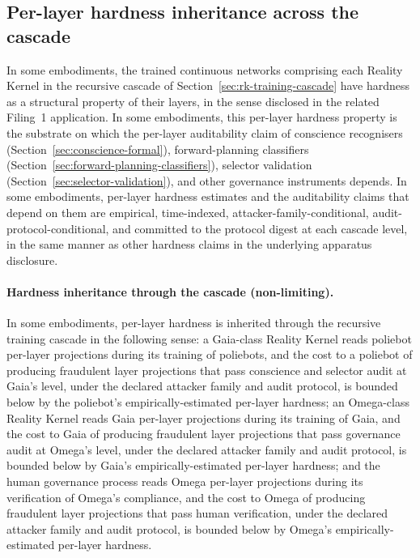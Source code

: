 \documentclass[a4paper,12pt]{article}
\newcommand{\RK}{Reality Kernel\xspace}
\begin{document}
\subsection{Per-layer hardness inheritance across the cascade}
\label{sec:per-layer-hardness}

In some embodiments, the trained continuous networks comprising each
\RK in the recursive cascade of
Section~\ref{sec:rk-training-cascade} have hardness as a structural
property of their layers, in the sense disclosed in the related
Filing~1 application. In some embodiments, this per-layer hardness
property is the substrate on which the per-layer auditability claim
of conscience recognisers (Section~\ref{sec:conscience-formal}),
forward-planning classifiers
(Section~\ref{sec:forward-planning-classifiers}), selector
validation (Section~\ref{sec:selector-validation}), and other
governance instruments depends. In some embodiments, per-layer
hardness estimates and the auditability claims that depend on them
are empirical, time-indexed, attacker-family-conditional,
audit-protocol-conditional, and committed to the protocol digest at
each cascade level, in the same manner as other hardness claims in
the underlying apparatus disclosure.

\paragraph{Hardness inheritance through the cascade (non-limiting).}
In some embodiments, per-layer hardness is inherited through the
recursive training cascade in the following sense: a Gaia-class
\RK reads poliebot per-layer projections during its
training of poliebots, and the cost to a poliebot of producing
fraudulent layer projections that pass conscience and selector
audit at Gaia's level, under the declared attacker family and audit
protocol, is bounded below by the poliebot's empirically-estimated
per-layer hardness; an Omega-class \RK reads Gaia
per-layer projections during its training of Gaia, and the cost to
Gaia of producing fraudulent layer projections that pass governance
audit at Omega's level, under the declared attacker family and audit
protocol, is bounded below by Gaia's empirically-estimated per-layer
hardness; and the human governance process reads Omega per-layer
projections during its verification of Omega's compliance, and the
cost to Omega of producing fraudulent layer projections that pass
human verification, under the declared attacker family and audit
protocol, is bounded below by Omega's empirically-estimated per-layer
hardness.
\end{document}
